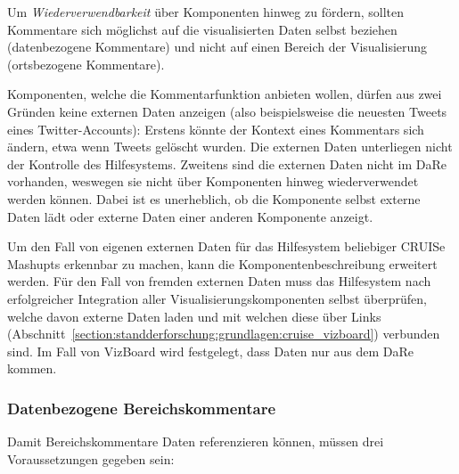 \documentclass[
	headsepline,
	footsepline,
	fontsize=12pt,
	bibliography=totoc
]{scrbook}
\begin{document}

Um \emph{Wiederverwendbarkeit} über Komponenten hinweg zu fördern, sollten Kommentare sich möglichst auf die visualisierten Daten selbst beziehen (datenbezogene Kommentare) und nicht auf einen Bereich der Visualisierung (ortsbezogene Kommentare).

Komponenten, welche die Kommentarfunktion anbieten wollen, dürfen aus zwei Gründen keine externen Daten anzeigen (also beispielsweise die neuesten Tweets eines Twitter-Accounts): Erstens könnte der Kontext eines Kommentars sich ändern, etwa wenn Tweets gelöscht wurden. Die externen Daten unterliegen nicht der Kontrolle des Hilfesystems. Zweitens sind die externen Daten nicht im DaRe vorhanden, weswegen sie nicht über Komponenten hinweg wiederverwendet werden können. Dabei ist es unerheblich, ob die Komponente selbst externe Daten lädt oder externe Daten einer anderen Komponente anzeigt.

Um den Fall von eigenen externen Daten für das Hilfesystem beliebiger CRUISe Mashupts erkennbar zu machen, kann die Komponentenbeschreibung erweitert werden. Für den Fall von fremden externen Daten muss das Hilfesystem nach erfolgreicher Integration aller Visualisierungskomponenten selbst überprüfen, welche davon externe Daten laden und mit welchen diese über Links (Abschnitt~\ref{section:standderforschung:grundlagen:cruise_vizboard}) verbunden sind. Im Fall von VizBoard wird festgelegt, dass Daten nur aus dem DaRe kommen.

\subsubsection{Datenbezogene Bereichskommentare}

Damit Bereichskommentare Daten referenzieren können, müssen drei Voraussetzungen gegeben sein:
\end{document}
